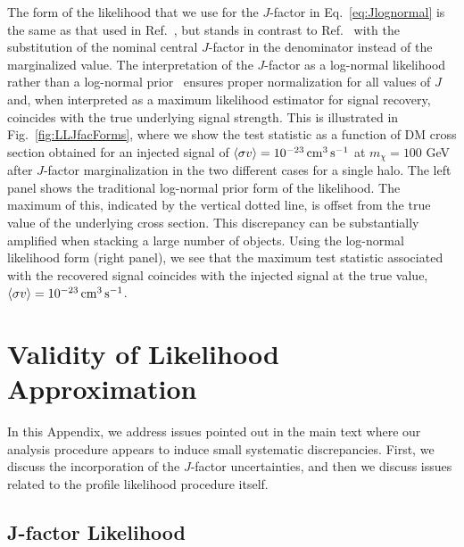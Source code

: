 The form of the likelihood that we use for the $J$-factor in Eq.~\ref{eq:Jlognormal} is the same as that used in Ref.~\cite{Ackermann:2015zua}, but stands in contrast to Ref.~\cite{Ackermann:2011wa,Ackermann:2013yva} with the substitution of the nominal central $J$-factor in the denominator instead of the marginalized value. The interpretation of the $J$-factor as a log-normal likelihood~\cite{Ackermann:2015zua}  rather than a log-normal prior~\cite{Ackermann:2011wa,Ackermann:2013yva} ensures proper normalization for all values of $J$ and, when interpreted as a maximum likelihood estimator for signal recovery, coincides with the true underlying signal strength. This is illustrated in Fig.~\ref{fig:LLJfacForms}, where we show the test statistic as a function of DM cross section obtained for an injected signal of $\langle\sigma v \rangle= 10^{-23}\,{\rm cm}^3\,{\rm s}^{-1}$ at $m_\chi =100$ GeV after $J$-factor marginalization in the two different cases for a single halo. The left panel shows the traditional log-normal prior form of the likelihood.  The maximum of this, indicated by the vertical dotted line, is offset from the true value of the underlying cross section. This discrepancy can be substantially amplified when stacking a large number of objects. Using the log-normal likelihood form (right panel), we see that the maximum test statistic associated with the recovered signal coincides with the injected signal at the true value, $\langle\sigma v \rangle= 10^{-23}\,{\rm cm}^3\,{\rm s}^{-1}$.


\section{Validity of Likelihood Approximation}
\label{app:energyrange}

In this Appendix, we address issues pointed out in the main text where our analysis procedure appears to induce small systematic discrepancies.  First, we discuss the incorporation of the $J$-factor uncertainties, and then we discuss issues related to the profile likelihood procedure itself. 

\subsection{J-factor Likelihood}


